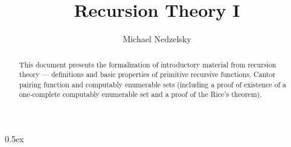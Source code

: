 \documentclass[11pt,a4paper]{article}
\begin{document}
\title{Recursion Theory I}
\author{Michael Nedzelsky}
\maketitle

\begin{abstract}
  This document presents the formalization of introductory material from
  recursion theory --- definitions and basic properties of primitive recursive
  functions, Cantor pairing function and computably enumerable sets
  (including a proof of existence of a one-complete computably enumerable set and a proof of the Rice's theorem).
\end{abstract}

\tableofcontents

\parindent 0pt\parskip 0.5ex





\end{document}
